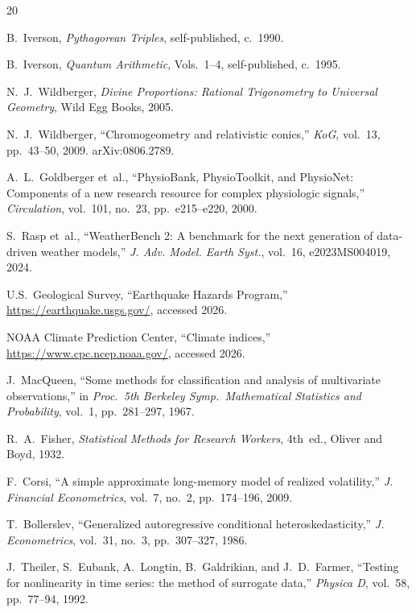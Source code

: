 \documentclass[11pt,a4paper]{article}
\begin{document}

\begin{thebibliography}{20}

B.~Iverson, \emph{Pythagorean Triples}, self-published, c.~1990.

B.~Iverson, \emph{Quantum Arithmetic}, Vols.~1--4, self-published, c.~1995.

N.~J.~Wildberger, \emph{Divine Proportions: Rational Trigonometry to
Universal Geometry}, Wild Egg Books, 2005.

N.~J.~Wildberger, ``Chromogeometry and relativistic conics,''
\emph{KoG}, vol.~13, pp.~43--50, 2009. arXiv:0806.2789.

A.~L.~Goldberger et~al., ``PhysioBank, PhysioToolkit, and PhysioNet:
Components of a new research resource for complex physiologic signals,''
\emph{Circulation}, vol.~101, no.~23, pp.~e215--e220, 2000.

S.~Rasp et~al., ``WeatherBench 2: A benchmark for the next generation of
data-driven weather models,'' \emph{J. Adv. Model. Earth Syst.},
vol.~16, e2023MS004019, 2024.

U.S.~Geological Survey, ``Earthquake Hazards Program,''
\url{https://earthquake.usgs.gov/}, accessed 2026.

NOAA Climate Prediction Center, ``Climate indices,''
\url{https://www.cpc.ncep.noaa.gov/}, accessed 2026.

J.~MacQueen, ``Some methods for classification and analysis of
multivariate observations,'' in \emph{Proc.\ 5th Berkeley Symp.\
Mathematical Statistics and Probability}, vol.~1, pp.~281--297, 1967.

R.~A.~Fisher, \emph{Statistical Methods for Research Workers},
4th~ed., Oliver and Boyd, 1932.

F.~Corsi, ``A simple approximate long-memory model of realized
volatility,'' \emph{J. Financial Econometrics}, vol.~7, no.~2,
pp.~174--196, 2009.

T.~Bollerslev, ``Generalized autoregressive conditional
heteroskedasticity,'' \emph{J. Econometrics}, vol.~31, no.~3,
pp.~307--327, 1986.

J.~Theiler, S.~Eubank, A.~Longtin, B.~Galdrikian, and J.~D.~Farmer,
``Testing for nonlinearity in time series: the method of surrogate
data,'' \emph{Physica D}, vol.~58, pp.~77--94, 1992.


\end{thebibliography}
\end{document}
